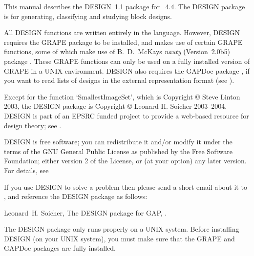 %
%
%
%
\def\GRAPE{\sf GRAPE}
\def\DESIGN{\sf DESIGN}
\def\GAPDoc{\sf GAPDoc}
\def\nauty{\it nauty}
\def\Aut{{\rm Aut}\,} 


This manual describes the {\DESIGN}~1.1 package for {\GAP}~4.4.
The {\DESIGN} package is for generating, classifying and studying block
designs.

All {\DESIGN} functions are written entirely in the {\GAP} language.
However, {\DESIGN} requires the {\GRAPE} package \cite{Grape} to be
installed, and makes use of certain {\GRAPE} functions, some of which
make use of B.~D.~McKay{\pif}s {\nauty} (Version~2.0b5) package
\cite{Nauty}. These {\GRAPE} functions can only be used on a fully
installed version of {\GRAPE} in a UNIX environment. {\DESIGN} also
requires the {\GAPDoc} package \cite{GAPDoc}, if you want to read lists
of designs in the  external representation
format (see \cite{Extrep}).

Except for the function `SmallestImageSet', which is Copyright
{\copyright} Steve Linton 2003, the {\DESIGN} package is Copyright
{\copyright} Leonard H. Soicher 2003--2004.  {\DESIGN} is part of an EPSRC
funded project to provide a web-based resource for design theory; see
.

{\DESIGN} is free software; you can redistribute it and/or modify
it under the terms of the GNU General Public License as published by
the Free Software Foundation; either version 2 of the License, or
(at your option) any later version. For details, see 

If you use {\DESIGN} to solve a problem then please send a short email
about it to , and reference the {\DESIGN} 
package as follows:

Leonard~H. Soicher, The {DESIGN} package for {GAP},
.


The {\DESIGN} package only runs properly on a UNIX system. Before
installing {\DESIGN} (on your UNIX system), you must make sure that the
{\GRAPE} and {\GAPDoc} packages are fully installed.


